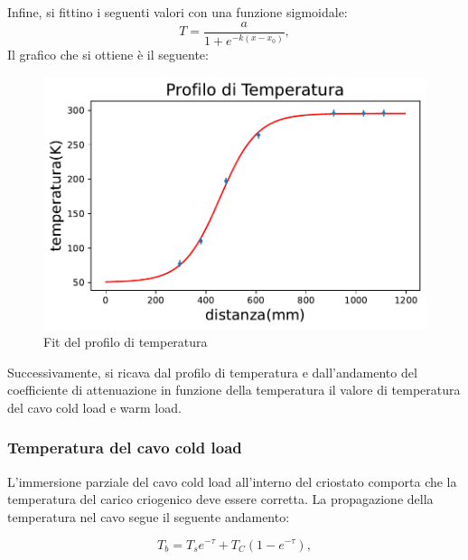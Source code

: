 Infine, si fittino i seguenti valori con una funzione sigmoidale:
\begin{equation}
T= \dfrac{a}{1+e^{-k(x-x_{0})}},
\end{equation}
Il grafico che si ottiene è il seguente:

\begin{figure}[H]
	\centering
	\includegraphics[scale=0.8]{Profilo_temperatura.pdf}
	\caption{Fit del profilo di temperatura}
    	\label{fig:Profilo_temperatura}
\end{figure}

Successivamente, si ricava dal profilo di  temperatura e dall'andamento del coefficiente di attenuazione in funzione della temperatura il valore di temperatura del cavo cold load e warm load.


\subsubsection{Temperatura del cavo cold load}
\label{ssec:Temperatura del cavo cold load}

L'immersione parziale del cavo cold load all'interno del criostato comporta che la temperatura del carico criogenico deve essere corretta. La propagazione della temperatura nel cavo segue il seguente andamento:

\begin{equation}
T_{b}= T_{s}e^{-\tau} + T_{C}(1-e^{-\tau}),
\label{Formula ricorsiva}
\end{equation}


